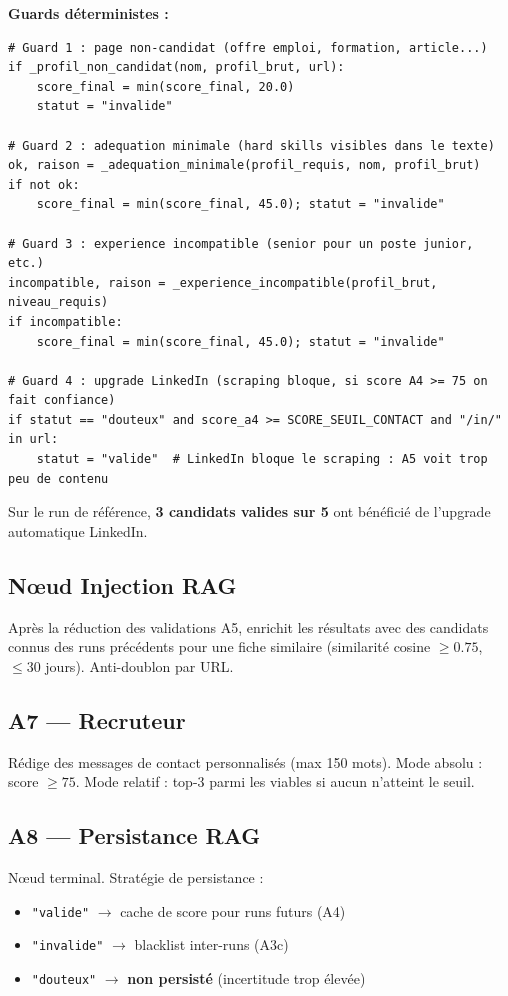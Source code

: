 \documentclass[12pt,a4paper]{report}
\begin{document}
\textbf{Guards déterministes :}

\begin{lstlisting}[caption={src/agents/verificateur.py --- Guards anti-faux positifs}]
# Guard 1 : page non-candidat (offre emploi, formation, article...)
if _profil_non_candidat(nom, profil_brut, url):
    score_final = min(score_final, 20.0)
    statut = "invalide"

# Guard 2 : adequation minimale (hard skills visibles dans le texte)
ok, raison = _adequation_minimale(profil_requis, nom, profil_brut)
if not ok:
    score_final = min(score_final, 45.0); statut = "invalide"

# Guard 3 : experience incompatible (senior pour un poste junior, etc.)
incompatible, raison = _experience_incompatible(profil_brut, niveau_requis)
if incompatible:
    score_final = min(score_final, 45.0); statut = "invalide"

# Guard 4 : upgrade LinkedIn (scraping bloque, si score A4 >= 75 on fait confiance)
if statut == "douteux" and score_a4 >= SCORE_SEUIL_CONTACT and "/in/" in url:
    statut = "valide"  # LinkedIn bloque le scraping : A5 voit trop peu de contenu
\end{lstlisting}

Sur le run de référence, \textbf{3 candidats valides sur 5} ont bénéficié de
l'upgrade automatique LinkedIn.

\subsection{Nœud Injection RAG}

Après la réduction des validations A5, enrichit les résultats avec des candidats
connus des runs précédents pour une fiche similaire (similarité cosine $\geq 0.75$,
$\leq 30$ jours). Anti-doublon par URL.

\subsection{A7 --- Recruteur}

Rédige des messages de contact personnalisés (max 150 mots). Mode absolu : score
$\geq 75$. Mode relatif : top-3 parmi les viables si aucun n'atteint le seuil.

\subsection{A8 --- Persistance RAG}

Nœud terminal. Stratégie de persistance :
\begin{itemize}[noitemsep]
  \item \texttt{"valide"} $\to$ cache de score pour runs futurs (A4)
  \item \texttt{"invalide"} $\to$ blacklist inter-runs (A3c)
  \item \texttt{"douteux"} $\to$ \textbf{non persisté} (incertitude trop élevée)
\end{itemize}
\end{document}
